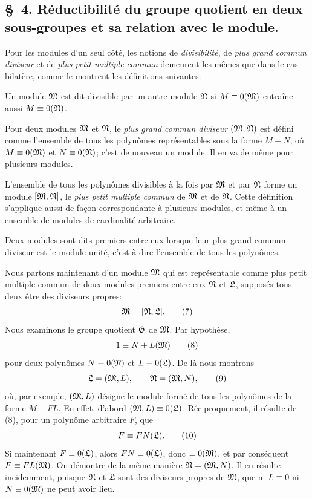 \subsection*{\S~4. Réductibilité du groupe quotient en deux sous-groupes et sa relation avec le module.}

Pour les modules d'un seul côté, les notions de \emph{divisibilité}, de \emph{plus grand commun diviseur} et de \emph{plus petit multiple commun} demeurent les mêmes que dans le cas bilatère, comme le montrent les définitions suivantes.

Un module $\mathfrak{M}$ est dit divisible par un autre module $\mathfrak{N}$ si $M\equiv0(\mathfrak{M})$ entraîne aussi $M\equiv0(\mathfrak{N})$.

Pour deux modules $\mathfrak{M}$ et $\mathfrak{N}$, le \emph{plus grand commun diviseur} $(\mathfrak{M},\mathfrak{N})$ est défini comme l'ensemble de tous les polynômes représentables sous la forme $M+N$, où $M\equiv0(\mathfrak{M})$ et $N\equiv0(\mathfrak{N})$; c'est de nouveau un module. Il en va de même pour plusieurs modules.

L'ensemble de tous les polynômes divisibles à la fois par $\mathfrak{M}$ et par $\mathfrak{N}$ forme un module $[\mathfrak{M},\mathfrak{N}]$, le \emph{plus petit multiple commun} de $\mathfrak{M}$ et de $\mathfrak{N}$. Cette définition s'applique aussi de façon correspondante à plusieurs modules, et même à un ensemble de modules de cardinalité arbitraire.

Deux modules sont dits premiers entre eux lorsque leur plus grand commun diviseur est le module unité, c'est-à-dire l'ensemble de tous les polynômes.

Nous partons maintenant d'un module $\mathfrak{M}$ qui est représentable comme plus petit multiple commun de deux modules premiers entre eux $\mathfrak{N}$ et $\mathfrak{L}$, supposés tous deux être des diviseurs propres:
\begin{equation}
 \mathfrak{M}=[\mathfrak{N},\mathfrak{L}].
\tag{7}
\end{equation}
Nous examinons le groupe quotient $\mathfrak{G}$ de $\mathfrak{M}$. Par hypothèse,
\begin{equation}
 1\equiv N+L(\mathfrak{M})
\tag{8}
\end{equation}
pour deux polynômes $N\equiv0(\mathfrak{N})$ et $L\equiv0(\mathfrak{L})$. De là nous montrons
\begin{equation}
 \mathfrak{L}=(\mathfrak{M},L),\qquad \mathfrak{N}=(\mathfrak{M},N),
\tag{9}
\end{equation}
où, par exemple, $(\mathfrak{M},L)$ désigne le module formé de tous les polynômes de la forme $M+FL$. En effet, d'abord $(\mathfrak{M},L)\equiv0(\mathfrak{L})$. Réciproquement, il résulte de (8), pour un polynôme arbitraire $F$, que
\begin{equation}
 F\equiv FN(\mathfrak{L}).
\tag{10}
\end{equation}
Si maintenant $F\equiv0(\mathfrak{L})$, alors $FN\equiv0(\mathfrak{L})$, donc $\equiv0(\mathfrak{M})$, et par conséquent $F\equiv FL(\mathfrak{M})$. On démontre de la même manière $\mathfrak{N}=(\mathfrak{M},N)$. Il en résulte incidemment, puisque $\mathfrak{N}$ et $\mathfrak{L}$ sont des diviseurs propres de $\mathfrak{M}$, que ni $L\equiv0$ ni $N\equiv0(\mathfrak{M})$ ne peut avoir lieu.

